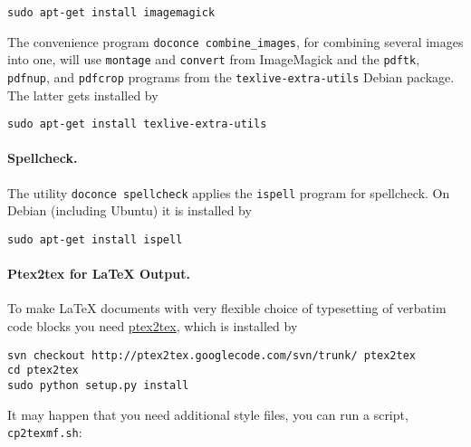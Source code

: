 \documentclass[%
oneside,                 %
final,                   %
10pt]{article}
\begin{document}
\vspace{4pt}
\begin{Verbatim}[numbers=none,frame=lines,label=\fbox{{\tiny Terminal}},fontsize=\fontsize{9pt}{9pt},
labelposition=topline,framesep=2.5mm,framerule=0.7pt]
sudo apt-get install imagemagick
\end{Verbatim}

The convenience program {\fontsize{10pt}{10pt}\Verb!doconce combine_images!}, for combining several
images into one, will use {\fontsize{10pt}{10pt}\Verb!montage!} and {\fontsize{10pt}{10pt}\Verb!convert!} from ImageMagick and
the {\fontsize{10pt}{10pt}\Verb!pdftk!}, {\fontsize{10pt}{10pt}\Verb!pdfnup!}, and {\fontsize{10pt}{10pt}\Verb!pdfcrop!} programs from the {\fontsize{10pt}{10pt}\Verb!texlive-extra-utils!}
Debian package. The latter gets installed by

\vspace{4pt}
\begin{Verbatim}[numbers=none,frame=lines,label=\fbox{{\tiny Terminal}},fontsize=\fontsize{9pt}{9pt},
labelposition=topline,framesep=2.5mm,framerule=0.7pt]
sudo apt-get install texlive-extra-utils
\end{Verbatim}

\paragraph{Spellcheck.}
The utility {\fontsize{10pt}{10pt}\Verb!doconce spellcheck!} applies the {\fontsize{10pt}{10pt}\Verb!ispell!} program for
spellcheck. On Debian (including Ubuntu) it is installed by

\vspace{4pt}
\begin{Verbatim}[numbers=none,frame=lines,label=\fbox{{\tiny Terminal}},fontsize=\fontsize{9pt}{9pt},
labelposition=topline,framesep=2.5mm,framerule=0.7pt]
sudo apt-get install ispell
\end{Verbatim}

\paragraph{Ptex2tex for {\LaTeX} Output.}
To make {\LaTeX} documents with very flexible choice of typesetting of
verbatim code blocks you need \href{{http://code.google.com/p/ptex2tex}}{ptex2tex},
which is installed by

\vspace{4pt}
\begin{Verbatim}[numbers=none,frame=lines,label=\fbox{{\tiny Terminal}},fontsize=\fontsize{9pt}{9pt},
labelposition=topline,framesep=2.5mm,framerule=0.7pt]
svn checkout http://ptex2tex.googlecode.com/svn/trunk/ ptex2tex
cd ptex2tex
sudo python setup.py install
\end{Verbatim}
It may happen that you need additional style files, you can run
a script, {\fontsize{10pt}{10pt}\Verb!cp2texmf.sh!}:
\end{document}
